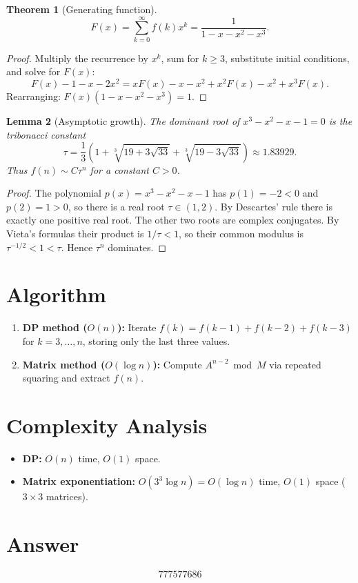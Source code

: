 \documentclass[12pt]{article}
\newtheorem{theorem}{Theorem}
\newtheorem{lemma}[theorem]{Lemma}
\begin{document}
\begin{theorem}[Generating function]
\[
F(x) = \sum_{k=0}^{\infty}f(k)x^k = \frac{1}{1-x-x^2-x^3}.
\]
\end{theorem}

\begin{proof}
Multiply the recurrence by $x^k$, sum for $k\ge 3$, substitute initial conditions, and solve for $F(x)$:
\[
F(x)-1-x-2x^2 = xF(x)-x-x^2+x^2F(x)-x^2+x^3F(x).
\]
Rearranging: $F(x)(1-x-x^2-x^3)=1$.
\end{proof}

\begin{lemma}[Asymptotic growth]
The dominant root of $x^3-x^2-x-1=0$ is the tribonacci constant
\[
\tau = \frac{1}{3}\!\left(1+\sqrt[3]{19+3\sqrt{33}}+\sqrt[3]{19-3\sqrt{33}}\right)\approx 1.83929.
\]
Thus $f(n)\sim C\tau^n$ for a constant $C>0$.
\end{lemma}

\begin{proof}
The polynomial $p(x)=x^3-x^2-x-1$ has $p(1)=-2<0$ and $p(2)=1>0$, so there is a real root $\tau\in(1,2)$. By Descartes' rule there is exactly one positive real root. The other two roots are complex conjugates. By Vieta's formulas their product is $1/\tau<1$, so their common modulus is $\tau^{-1/2}<1<\tau$. Hence $\tau^n$ dominates.
\end{proof}

\section{Algorithm}
\begin{enumerate}
\item \textbf{DP method ($O(n)$):} Iterate $f(k)=f(k-1)+f(k-2)+f(k-3)$ for $k=3,\ldots,n$, storing only the last three values.
\item \textbf{Matrix method ($O(\log n)$):} Compute $A^{n-2}\bmod M$ via repeated squaring and extract $f(n)$.
\end{enumerate}

\section{Complexity Analysis}
\begin{itemize}
\item \textbf{DP:} $O(n)$ time, $O(1)$ space.
\item \textbf{Matrix exponentiation:} $O(3^3\log n) = O(\log n)$ time, $O(1)$ space ($3\times 3$ matrices).
\end{itemize}

\section{Answer}

\[
\boxed{777577686}
\]
\end{document}
